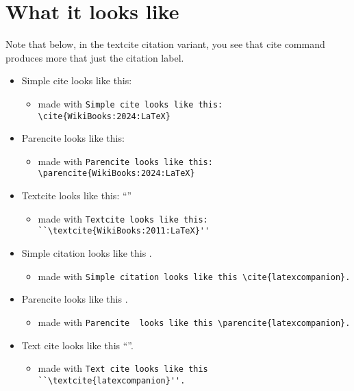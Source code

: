 \documentclass[12pt,a4paper,dvipsnames]{article}
\begin{document}
	
\section*{What it looks like}

Note that below, in the textcite citation variant, you see that cite command produces more that just the citation label.

\begin{itemize}
\item Simple cite looks like this: \cite{WikiBooks:2024:LaTeX}
  \begin{itemize}
  \item made with {\color{PineGreen}\tt{}\lstinline#Simple cite looks like this: \cite{WikiBooks:2024:LaTeX}#}
  \end{itemize}
\item Parencite looks like this: \parencite{WikiBooks:2024:LaTeX}
  \begin{itemize}
  \item made with {\color{PineGreen}\tt{}\lstinline#Parencite looks like this: \parencite{WikiBooks:2024:LaTeX}#}
  \end{itemize}
\item Textcite looks like this: ``\textcite{WikiBooks:2011:LaTeX}''
  \begin{itemize}
  \item made with {\color{PineGreen}\tt{}\lstinline#Textcite looks like this: ``\textcite{WikiBooks:2011:LaTeX}''#}
  \end{itemize}
\item Simple citation looks like this \cite{latexcompanion}.
  \begin{itemize}
  \item  made with {\color{PineGreen}\tt{}\lstinline#Simple citation looks like this \cite{latexcompanion}.#}
  \end{itemize}
\item Parencite looks like this \parencite{latexcompanion}.
  \begin{itemize}
  \item  made with {\color{PineGreen}\tt{}\lstinline#Parencite  looks like this \parencite{latexcompanion}.#}
  \end{itemize}
\item Text cite looks like this ``\textcite{latexcompanion}''.
  \begin{itemize}
  \item  made with {\color{PineGreen}\tt{}\lstinline#Text cite looks like this ``\textcite{latexcompanion}''.#}

\end{itemize}
\end{itemize}
\end{document}
